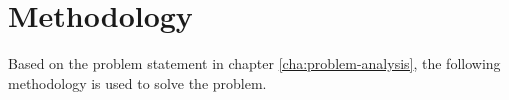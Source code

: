 \chapter{Methodology}\label{cha:methodology}
Based on the problem statement in chapter \ref{cha:problem-analysis}, the following methodology is used to solve the problem.


